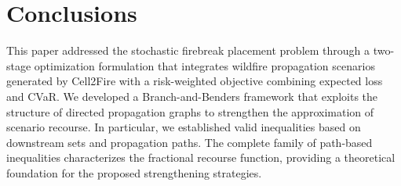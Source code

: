 \documentclass{itor}
\begin{document}
% 



\section{Conclusions}\label{sec:conclusions}

This paper addressed the stochastic firebreak placement problem through
a two-stage optimization formulation that integrates wildfire propagation
scenarios generated by Cell2Fire with a risk-weighted objective combining
expected loss and CVaR. We developed a Branch-and-Benders framework
that exploits the structure of directed propagation graphs to strengthen
the approximation of scenario recourse. In particular, we established
valid inequalities based on downstream sets and propagation paths.
The complete family of path-based inequalities characterizes the
fractional recourse function, providing a theoretical foundation for
the proposed strengthening strategies.
\end{document}

